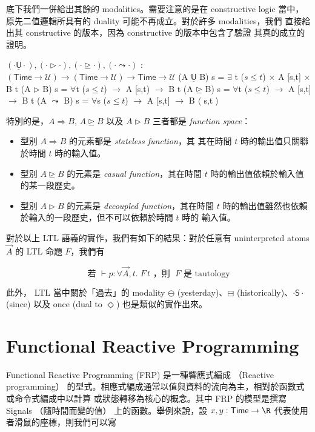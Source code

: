 \documentclass{article}
\newcommand{\Time}{\mathsf{Time}}
\newcommand{\TU}{\mathsf{U}}
\newcommand{\U}{\mathcal{U}}
\begin{document}
  底下我們一併給出其餘的 modalities。需要注意的是在 constructive logic
  當中，原先二值邏輯所具有的 duality 可能不再成立。對於許多 modalities，我們
  直接給出其 constructive 的版本，因為 constructive 的版本中包含了驗證
  其真的成立的證明。

  \begin{code}
  $(\cdot\underline{\TU}\cdot),(\cdot\rhd\cdot),(\cdot\unrhd\cdot),(\cdot\leadsto\cdot)$ : $(\Time\to\U)\to(\Time\to\U)\to\Time\to\U$
  (A $\underline{\TU}$ B) s = $\exists$ {t} ($s\le t$) $\times$ A [s,t] $\times$ B t
  (A $\rhd$ B) s = $\forall${t} ($s\le t$) $\to$ A [s,t) $\to$ B t
  (A $\unrhd$ B) s = $\forall${t} ($s\le t$) $\to$ A [s,t] $\to$ B t
  (A $\leadsto$ B) s = $\forall${s} ($s\le t$) $\to$ A [s,t] $\to$ B $\langle$ s,t $\rangle$
  \end{code}

  特別的是，$A\Rightarrow B$, $A\unrhd B$ 以及 $A\rhd B$ 三者都是
  \emph{function space}：

  \begin{itemize}
    \item 型別 $A\Rightarrow B$ 的元素都是 \emph{stateless function}，其
    其在時間 $t$ 時的輸出值只關聯於時間 $t$ 時的輸入值。

    \item 型別 $A\unrhd B$ 的元素是 \emph{casual function}，其在時間 $t$
    時的輸出值依賴於輸入值的某一段歷史。

    \item 型別 $A\rhd B$ 的元素是 \emph{decoupled function}，其在時間 $t$
    時的輸出值雖然也依賴於輸入的一段歷史，但不可以依賴於時間 $t$ 時的
    輸入值。
  \end{itemize}

  對於以上 LTL 語義的實作，我們有如下的結果：對於任意有 uninterpreted atoms
  $\overrightarrow{A}$ 的 LTL 命題 $F$，我們有

  \[ \text{若 } \vdash p:\forall{\overrightarrow{A}},t.\; F\,t \text{ ，則 } \;F \text{ 是 tautology}\]

  此外， LTL 當中關於「過去」的 modality $\ominus$ (yesterday)、$\boxminus$
  (historically)、$\cdot\mathsf{S}\cdot$ (since) 以及 once (dual to $\Diamond$)
  也是類似的實作出來。

\section{Functional Reactive Programming}
  Functional Reactive Programming (FRP) 是一種響應式編成
  （Reactive programming）
  的型式。相應式編成通常以值與資料的流向為主，相對於函數式或命令式編成中以計算
  或狀態轉移為核心的概念。其中 FRP 的模型是撰寫 Signals （隨時間而變的值）
  上的函數。舉例來說，設 $x,y:\Time\to\R$ 代表使用者滑鼠的座標，則我們可以寫
\end{document}
